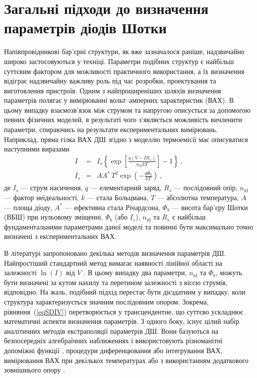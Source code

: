 \documentclass[a4paper,14pt,oneside,openany]{memoir}
\begin{document}
\section{Загальні підходи до визначення параметрів діодів Шотки}
Напівпровідникові бар'єрні структури, як вже зазначалося раніше, надзвичайно широко застосовуються у техніці.
Параметри подібних структур є найбільш суттєвим фактором для можливості практичного використання,
а їх визначення відіграє надзвичайну важливу роль під час розробки, проектування та виготовлення пристроїв.
Одним з найпроширеніших шляхів визначення параметрів полягає у вимірюванні вольт--амперних характеристик (ВАХ).
В цьому випадку взаємозв'язок між струмом та напругою описується за допомогою певних фізичних моделей, в
результаті чого з'являється можливість вичленити параметри, спираючись на результати експериментальних вимірювань.
Наприклад, пряма гілка ВАХ ДШ згідно з моделлю термоемісії має описуватися \cite{Rhoderick1988} наступними виразами
\begin{eqnarray}
\label{eqSDIV}
I&=&I_s\left\{\exp\left[\frac{q(V-IR_s)}{n_\mathrm{id}kT}\right]-1\right\}\,,\\
\label{eqSDIs}
I_s&=&AA^*\,T^2\exp\left(-\frac{q\Phi_b}{kT}\right)\,,
\end{eqnarray}
де
$I_s$ --- струм насичення,
$q$ --- елементарний заряд,
$R_s$ --- послідовний опір,
$n_\mathrm{id}$ --- фактор неідеальності,
$k$ --- стала Больцмана,
$T$ --- абсолютна температура,
$A$ --- площа діоду,
$A^*$ --- ефективна стала Річардсона,
$\Phi_b$ --- висота бар'єру Шотки (ВБШ) при нульовому зміщенні.
$\Phi_b$ (або $I_s$), $n_\mathrm{id}$ та $R_s$ є найбільш фундаментальними параметрами даної моделі та повинні бути максимально точно визначені з експериментальних ВАХ.

В літературі запропоновано декілька методів визначення параметрів ДШ.
Найпростіший стандартний метод вимагає наявності лінійної області на залежності $\ln(I)$ від  $V$ \cite{Sze1985,Rhoderick1988}.
В цьому випадку два параметри, $n_\mathrm{id}$ та $\Phi_b$, можуть бути визначені за кутом нахилу та перетином  залежності з віссю струмів, відповідно.
На жаль, подібний підхід перестає бути дієздатним у випадку, коли структура характеризується значним послідовним опором.
Зокрема, рівняння~(\ref{eqSDIV}) перетворюється у трансцендентне, що суттєво ускладнює математичні аспекти визначення параметрів.
З одного боку, існує цілий набір аналітичних методів екстраполяції параметрів ДШ.
Вони базуються на безпосередніх алгебраїчних наближеннях і використовують різноманітні допоміжні функції \cite{Norde,Lien,Werner,Cheung,Gromov,Lee,Bohlin,Cibils,Manifacier},
процедури  диференцювання  \cite{Mikhelashvili} або інтегрування  \cite{Kaminski,Ortiz1995,Durmus} ВАХ,
вимірювання ВАХ при декількох температурах \cite{Sato} або з використанням додаткового зовнішнього опору \cite{Lyakas}.
\end{document}
